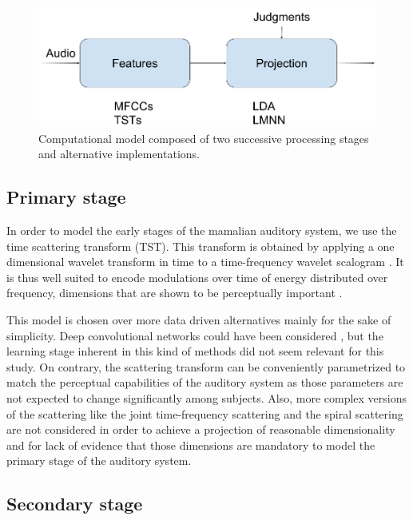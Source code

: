 \documentclass{article}
\begin{document}
\begin{figure}[t]
\center
\includegraphics[width = \textwidth]{figures/spontaneousSimilarity.png}
\caption{Computational model composed of two successive processing stages and alternative implementations.}
\label{fig:model}
\end{figure}

\subsection{Primary stage}

In order to model the early stages of the mamalian auditory system, we use the time scattering transform (TST). This transform is obtained by applying a one dimensional
wavelet transform in time to a time-frequency wavelet scalogram \cite{anden2014deep}. It is thus well suited to encode modulations over time of energy distributed over frequency, dimensions that are shown to be perceptually important \cite{dau1997modeling}.

This model is chosen over more data driven alternatives mainly for the sake of simplicity. Deep convolutional networks could have been considered \cite{lee2009unsupervised}, but the learning stage inherent in this kind of methods did not seem relevant for this study. On contrary, the scattering transform can be conveniently parametrized to match the perceptual capabilities of the auditory system as those parameters are not expected to change significantly among subjects. Also, more complex versions of the scattering like the joint time-frequency scattering \cite{anden2015joint} and the spiral scattering \cite{lostanlen2016wavelet} are not considered in order to achieve a projection of reasonable dimensionality and for lack of evidence that those dimensions are mandatory to model the primary stage of the auditory system.

\subsection{Secondary stage}
\end{document}
